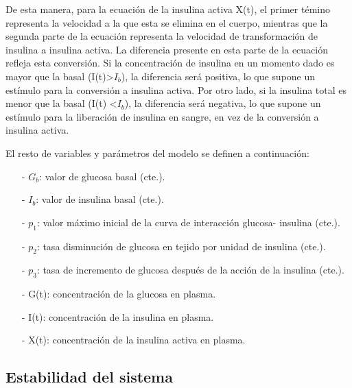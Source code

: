 De esta manera, para la ecuación de la insulina activa X(t), el primer témino representa la velocidad a la que esta se elimina en el cuerpo, mientras que la segunda parte de la ecuación representa la velocidad de transformación de insulina a insulina activa. La diferencia presente en esta parte de la ecuación refleja esta conversión. Si la concentración de insulina en un momento dado es mayor que la basal (I(t)>$I_b$), la diferencia será positiva, lo que supone un estímulo para la conversión a insulina activa. Por otro lado, si la insulina total es menor que la basal (I(t) <$I_b$), la diferencia será negativa, lo que supone un estímulo para la liberación de insulina en sangre, en vez de la conversión a insulina activa. 

El resto de variables y parámetros del modelo se definen a continuación:
\begin{enumerate}
    \item[-] $G_b$: valor de glucosa basal (cte.).
    \item[-] $I_b$: valor de insulina basal (cte.).
    \item[-] $p_1$: valor máximo inicial de la curva de interacción glucosa- insulina (cte.).
    \item[-] $p_2$: tasa disminución de glucosa en tejido por unidad de insulina (cte.).
    \item[-] $p_3$: tasa de incremento de glucosa después de la acción de la insulina (cte.). 
    \item[-] G(t): concentración de la glucosa en plasma.
    \item[-] I(t): concentración de la insulina en plasma.
    \item[-] X(t): concentración de la insulina activa en plasma.
\end{enumerate}

\subsection{Estabilidad del sistema}
\label{sec:est_estac}

